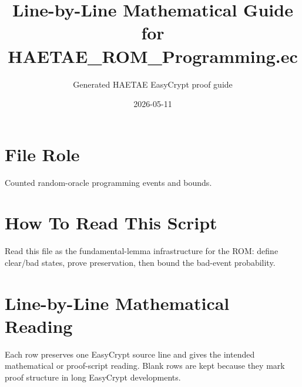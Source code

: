 \documentclass[10pt]{article}
\title{Line-by-Line Mathematical Guide for HAETAE\_ROM\_Programming.ec}
\author{Generated HAETAE EasyCrypt proof guide}
\date{2026-05-11}
\begin{document}
\maketitle

\section*{File Role}
Counted random-oracle programming events and bounds.

\section*{How To Read This Script}
Read this file as the fundamental-lemma infrastructure for the ROM: define clear/bad states, prove preservation, then bound the bad-event probability.

\section*{Line-by-Line Mathematical Reading}
Each row preserves one EasyCrypt source line and gives the intended mathematical
or proof-script reading.  Blank rows are kept because they mark proof structure
in long EasyCrypt developments.
\end{document}

